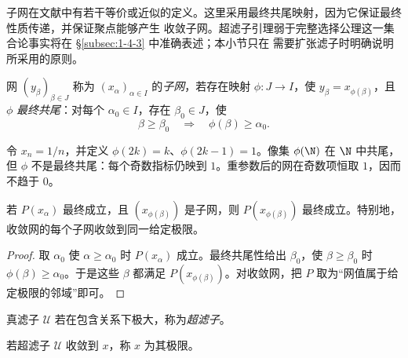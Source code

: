 \begin{remark}
子网在文献中有若干等价或近似的定义。这里采用最终共尾映射，因为它保证最终性质传递，并保证聚点能够产生
收敛子网。超滤子引理弱于完整选择公理这一集合论事实将在 \S\ref{subsec:1-4-3} 中准确表述；本小节只在
需要扩张滤子时明确说明所采用的原则。
\end{remark}

\begin{definition}[子网]\label{def:1-1-3-1}
网 \((y_\beta)_{\beta\in J}\) 称为 \((x_\alpha)_{\alpha\in I}\) 的\emph{子网}，若存在映射
\(\phi:J\to I\)，使 \(y_\beta=x_{\phi(\beta)}\)，且 \(\phi\) \emph{最终共尾}：对每个
\(\alpha_0\in I\)，存在 \(\beta_0\in J\)，使
\[
 \beta\ge\beta_0\quad\Longrightarrow\quad\phi(\beta)\ge\alpha_0.
\]
\end{definition}

\begin{example}[仅有共尾像还不够]\label{ex:1-1-3-3}
令 \(x_n=1/n\)，并定义 \(\phi(2k)=k\)、\(\phi(2k-1)=1\)。像集 \(\phi(\N)\) 在 \(\N\) 中共尾，
但 \(\phi\) 不是最终共尾：每个奇数指标仍映到 \(1\)。重参数后的网在奇数项恒取 \(1\)，因而不趋于 \(0\)。
\end{example}

\begin{proposition}[子网继承最终性质]\label{proposition:1-1-3-subnet-eventual}
若 \(P(x_\alpha)\) 最终成立，且 \((x_{\phi(\beta)})\) 是子网，则
\(P(x_{\phi(\beta)})\) 最终成立。特别地，收敛网的每个子网收敛到同一给定极限。
\end{proposition}
\begin{proof}
取 \(\alpha_0\) 使 \(\alpha\ge\alpha_0\) 时 \(P(x_\alpha)\) 成立。最终共尾性给出 \(\beta_0\)，使
\(\beta\ge\beta_0\) 时 \(\phi(\beta)\ge\alpha_0\)。于是这些 \(\beta\) 都满足
\(P(x_{\phi(\beta)})\)。对收敛网，把 \(P\) 取为“网值属于给定极限的邻域”即可。
\end{proof}

\begin{definition}[超滤子]\label{def:1-1-3-2}
真滤子 \(\mathcal U\) 若在包含关系下极大，称为\emph{超滤子}。
\end{definition}

\begin{definition}[超滤子极限]\label{def:1-1-3-3}
若超滤子 \(\mathcal U\) 收敛到 \(x\)，称 \(x\) 为其极限。
\end{definition}

